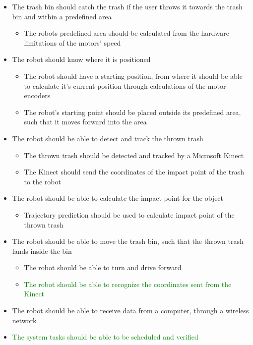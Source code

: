 \begin{itemize}
	\item The trash bin should catch the trash if the user throws it towards the trash bin and within a predefined area
	\begin{itemize}
		\item {The robots predefined area should be calculated from the hardware limitations of the motors’ speed}
	\end{itemize}
	\item The robot should know where it is positioned
	\begin{itemize}
		\item {The robot should have a starting position, from where it should be able to calculate it's current position through calculations of the motor encoders}
		\item {The robot's starting point should be placed outside its predefined area, such that it moves forward into the area}
	\end{itemize}
	\item The robot should be able to detect and track the thrown trash
	\begin{itemize}
		\item {The thrown trash should be detected and tracked by a Microsoft Kinect}
		\item {The Kinect should send the coordinates of the impact point of the trash to the robot}
	\end{itemize}
	\item The robot should be able to calculate the impact point for the object
	\begin{itemize}
		\item {Trajectory prediction should be used to calculate impact point of the thrown trash}
	\end{itemize}
	\item The robot should be able to move the trash bin, such that the thrown trash lands inside the bin
	\begin{itemize}
		\item {The robot should be able to turn and drive forward}
		\item\textcolor{green}{The robot should be able to recognize the coordinates sent from the Kinect}
	\end{itemize}
	\item {The robot should be able to receive data from a computer, through a wireless network}
	\item \textcolor{green}{The system tasks should be able to be scheduled and verified}
\end{itemize}
